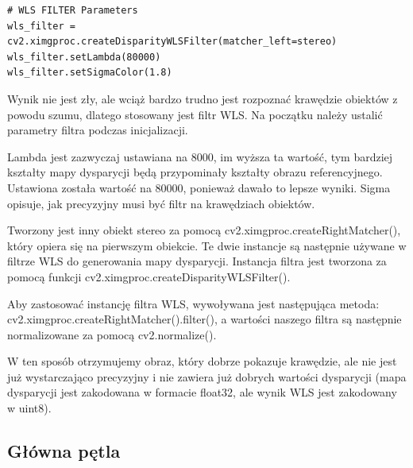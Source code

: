 \documentclass[magisterska]{pracadypl}
\begin{document}
\begin{lstlisting}[style=mypython]
# WLS FILTER Parameters
wls_filter = cv2.ximgproc.createDisparityWLSFilter(matcher_left=stereo)
wls_filter.setLambda(80000)
wls_filter.setSigmaColor(1.8)
\end{lstlisting}

Wynik nie jest zły, ale wciąż bardzo trudno jest rozpoznać krawędzie obiektów z powodu szumu, dlatego stosowany jest filtr WLS. Na początku należy ustalić parametry filtra podczas inicjalizacji.

Lambda jest zazwyczaj ustawiana na 8000, im wyższa ta wartość, tym bardziej kształty mapy dysparycji będą przypominały kształty obrazu referencyjnego. Ustawiona została wartość na 80000, ponieważ dawało to lepsze wyniki. Sigma opisuje, jak precyzyjny musi być filtr na krawędziach obiektów.

Tworzony jest inny obiekt stereo za pomocą cv2.ximgproc.createRightMatcher(), który opiera się na pierwszym obiekcie. Te dwie instancje są następnie używane w filtrze WLS do generowania mapy dysparycji. Instancja filtra jest tworzona za pomocą funkcji cv2.ximgproc.createDisparityWLSFilter().

Aby zastosować instancję filtra WLS, wywoływana jest następująca metoda: cv2.ximgproc.createRightMatcher().filter(), a wartości naszego filtra są następnie normalizowane za pomocą cv2.normalize().

W ten sposób otrzymujemy obraz, który dobrze pokazuje krawędzie, ale nie jest już wystarczająco precyzyjny i nie zawiera już dobrych wartości dysparycji (mapa dysparycji jest zakodowana w formacie float32, ale wynik WLS jest zakodowany w uint8).


\subsection{Główna pętla}
\end{document}
